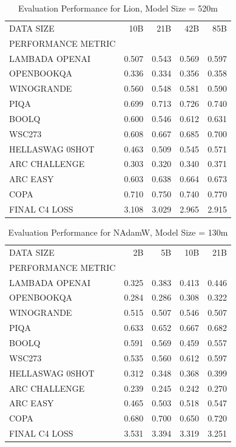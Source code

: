\begin{table}
[H] \centering \caption{Evaluation Performance for Lion, Model Size = 520m}
\label{tab:eval-performance-lion-520M}
\begin{tabular}{lrrrr}
\toprule
DATA SIZE & 10B & 21B & 42B & 85B \\
PERFORMANCE METRIC &  &  &  &  \\
\midrule
LAMBADA OPENAI & 0.507 & 0.543 & 0.569 & 0.597 \\
OPENBOOKQA & 0.336 & 0.334 & 0.356 & 0.358 \\
WINOGRANDE & 0.560 & 0.548 & 0.581 & 0.590 \\
PIQA & 0.699 & 0.713 & 0.726 & 0.740 \\
BOOLQ & 0.600 & 0.546 & 0.612 & 0.631 \\
WSC273 & 0.608 & 0.667 & 0.685 & 0.700 \\
HELLASWAG 0SHOT & 0.463 & 0.509 & 0.545 & 0.571 \\
ARC CHALLENGE & 0.303 & 0.320 & 0.340 & 0.371 \\
ARC EASY & 0.603 & 0.638 & 0.664 & 0.673 \\
COPA & 0.710 & 0.750 & 0.740 & 0.770 \\
FINAL C4 LOSS & 3.108 & 3.029 & 2.965 & 2.915 \\
\bottomrule
\end{tabular}
\end{table}


\begin{table}
[H] \centering \caption{Evaluation Performance for NAdamW, Model Size = 130m}
\label{tab:eval-performance-nadamw-130M}
\begin{tabular}{lrrrr}
\toprule
DATA SIZE & 2B & 5B & 10B & 21B \\
PERFORMANCE METRIC &  &  &  &  \\
\midrule
LAMBADA OPENAI & 0.325 & 0.383 & 0.413 & 0.446 \\
OPENBOOKQA & 0.284 & 0.286 & 0.308 & 0.322 \\
WINOGRANDE & 0.515 & 0.507 & 0.546 & 0.507 \\
PIQA & 0.633 & 0.652 & 0.667 & 0.682 \\
BOOLQ & 0.591 & 0.569 & 0.459 & 0.557 \\
WSC273 & 0.535 & 0.560 & 0.612 & 0.597 \\
HELLASWAG 0SHOT & 0.312 & 0.348 & 0.368 & 0.399 \\
ARC CHALLENGE & 0.239 & 0.245 & 0.242 & 0.270 \\
ARC EASY & 0.465 & 0.503 & 0.518 & 0.547 \\
COPA & 0.680 & 0.700 & 0.650 & 0.720 \\
FINAL C4 LOSS & 3.531 & 3.394 & 3.319 & 3.251 \\
\bottomrule
\end{tabular}
\end{table}


